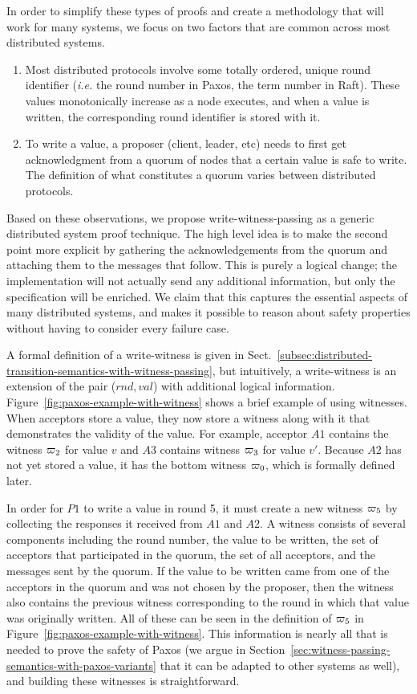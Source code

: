 In order to simplify these types of proofs and create a methodology that will work for many systems,
we focus on two factors that are common across most distributed systems.
\begin{enumerate}
\item Most distributed protocols involve some totally ordered, unique round identifier (\textit{i.e.} the round number in Paxos, the term number in Raft).
These values monotonically increase as a node executes, and when a value is written, the corresponding round identifier is stored with it.
\item To write a value, a proposer (client, leader, etc) needs to first get acknowledgment
from a quorum of nodes that a certain value is safe to write.
The definition of what constitutes a quorum varies between distributed protocols.
\end{enumerate}

Based on these observations, we propose write-witness-passing as a generic distributed system proof technique.
The high level idea is to make the second point more explicit by gathering the acknowledgements from the quorum
and attaching them to the messages that follow.
This is purely a logical change; the implementation will not actually send any additional information, but only the specification
will be enriched.
We claim that this captures the essential aspects of many distributed systems, and makes it possible to reason about
safety properties without having to consider every failure case.

A formal definition of a write-witness is given in Sect.~\ref{subsec:distributed-transition-semantics-with-witness-passing},
but intuitively, a write-witness is an extension of the pair ($rnd, val$) with additional logical information.
Figure~\ref{fig:paxos-example-with-witness} shows a brief example of using witnesses.
When acceptors store a value, they now store a witness along with it that demonstrates the validity of the value.
For example, acceptor $A1$ contains the witness $\varpi_2$ for value $v$ and $A3$ contains witness $\varpi_3$ for value $v'$.
Because $A2$ has not yet stored a value, it has the bottom witness $\varpi_0$, which is formally defined later.

In order for $P1$ to write a value in round 5, it must create a new witness $\varpi_5$ by collecting the responses it received from $A1$ and $A2$.
A witness consists of several components including
the round number, the value to be written, the set of acceptors that participated in the quorum, the set of all acceptors,
and the messages sent by the quorum.
If the value to be written came from one of the acceptors in the quorum and was not chosen by the proposer, then the witness
also contains the previous witness corresponding to the round in which that value was originally written.
All of these can be seen in the definition of $\varpi_5$ in Figure~\ref{fig:paxos-example-with-witness}.
This information is nearly all that is needed to prove the safety of Paxos
(we argue in Section~\ref{sec:witness-passing-semantics-with-paxos-variants} that it can be adapted to other systems as well),
and building these witnesses is straightforward.

